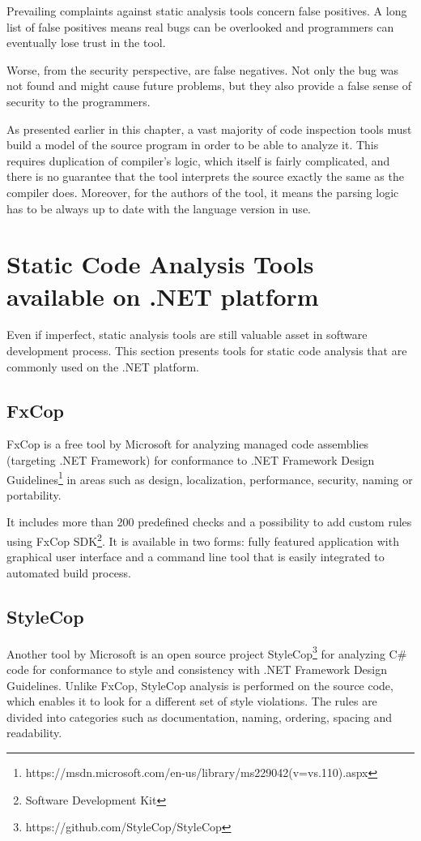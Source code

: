 \documentclass[
  digital, %
  table,   %
  lof,     %
  lot,     %
  oneside,
]{fithesis3}
\begin{document}
Prevailing complaints against static analysis tools concern false positives. A long list of false positives means real bugs can be overlooked and programmers can eventually lose trust in the tool.

Worse, from the security perspective, are false negatives. Not only the bug was not found and might cause future problems, but they also provide a false sense of security to the programmers. 

As presented earlier in this chapter, a vast majority of code inspection tools must build a model of the source program in order to be able to analyze it. This requires duplication of compiler's logic, which itself is fairly complicated, and there is no guarantee that the tool interprets the source exactly the same as the compiler does. Moreover, for the authors of the tool, it means the parsing logic has to be always up to date with the language version in use. 

\section{Static Code Analysis Tools available on .NET platform}
Even if imperfect, static analysis tools are still valuable asset in software development process. This section presents tools for static code analysis that are commonly used on the .NET platform.

\subsection{FxCop}
FxCop is a free tool by Microsoft for analyzing managed code assemblies (targeting .NET Framework) for conformance to .NET Framework Design Guidelines\footnote{https://msdn.microsoft.com/en-us/library/ms229042(v=vs.110).aspx} in areas such as design, localization, performance, security, naming or portability. 

It includes more than 200 predefined checks and a possibility to add custom rules using FxCop SDK\footnote{Software Development Kit}. It is available in two forms: fully featured application with graphical user interface and a command line tool that is easily integrated to automated build process. 

\subsection{StyleCop}
Another tool by Microsoft is an open source project StyleCop\footnote{https://github.com/StyleCop/StyleCop} for analyzing C\# code for conformance to style and consistency with .NET Framework Design Guidelines. Unlike FxCop, StyleCop analysis is performed on the source code, which enables it to look for a different set of style violations. The rules are divided into categories such as documentation, naming, ordering, spacing and readability. 
\end{document}
